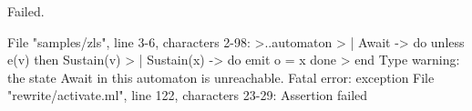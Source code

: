 \chklistingfalse
{}
\begin{ChkListingMsg}
Failed.
\end{ChkListingMsg}
\begin{ChkListingErr}
File "samples/zls", line 3-6, characters 2-98:
>..automaton
>  | Await -> do unless e(v) then Sustain(v)
>  | Sustain(x) -> do emit o = x done
>  end
Type warning: the state Await in this automaton is unreachable.
Fatal error: exception File "rewrite/activate.ml", line 122, characters 23-29: Assertion failed
\end{ChkListingErr}
